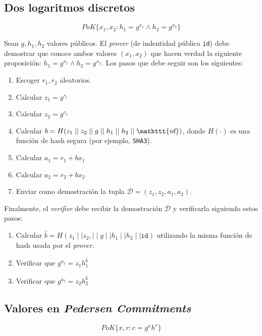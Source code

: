 \subsection{Dos logaritmos discretos}

$$PoK\{x_1, x_2 : h_1 = g^{x_1} \land h_2 = g^{x_2}\}$$

Sean $g,h_1,h_2$ valores públicos. El \emph{prover} (de indentidad pública \texttt{id}) debe demostrar que conoce ambos valores $(x_1,x_2)$ que hacen verdad la siguiente proposición: $h_1 = g^{x_1} \land h_2 = g^{x_2}$. Los pasos que debe seguir son los siguientes:
\begin{enumerate}
	\item Escoger $r_1, r_2$ aleatorios.
	\item Calcular $z_1 = g^{r_1} $
	\item Calcular $z_2 = g^{r_2}$
	\item Calcular $b = H(z_1 \mid\mid z_2 \mid\mid g \mid\mid h_1 \mid\mid h_2 \mid\mid \mathttt{id})$, donde $H(\cdot)$ es una función de hash segura (por ejemplo, \texttt{SHA3}).
	\item Calcular $a_1 = r_1 + b x_1$
	\item Calcular $a_2 = r_2 + b x_2$
	\item Enviar como demostración la tupla $\mathcal{D} = (z_1, z_2, a_1, a_2)$.
\end{enumerate}

Finalmente, el \emph{verifier} debe recibir la demostración $\mathcal{D}$ y verificarla siguiendo estos pasos:
\begin{enumerate}
	\item Calcular $\hat{b} = H(z_1 \mid\mid z_2, \mid\mid g \mid\mid h_1 \mid\mid h_2 \mid\mid \mathtt{id})$ utilizando la misma función de hash usada por el \emph{prover}.
	\item Verificar que $g^{a_1} = z_1 h_1^\hat{b}$
	\item Verificar que $g^{a_2} = z_2 h_2^\hat{b}$
\end{enumerate}

\subsection{Valores en \emph{Pedersen Commitments}}

$$PoK\{x, r : c = g^x h^r\}$$

